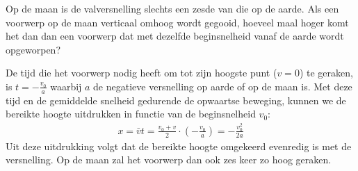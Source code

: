\documentclass{ximera}
\begin{document}
\begin{exercise}
	Op de maan is de valversnelling slechts een zesde van die op de aarde. Als een voorwerp op de maan verticaal omhoog wordt gegooid, hoeveel maal hoger komt het dan dan een voorwerp dat met dezelfde beginsnelheid vanaf de aarde wordt opgeworpen?

	\begin{oplossing}
		De tijd die het voorwerp nodig heeft om tot zijn hoogste punt ($v=0$) te geraken, is $t=-\frac{v_0}{a}$ waarbij $a$ de negatieve versnelling op aarde of op de maan is. Met deze tijd en de gemiddelde snelheid gedurende de opwaartse beweging, kunnen we de bereikte hoogte uitdrukken in functie van de beginsnelheid $v_0$:
		\begin{eqnarray*}
			x=\bar{v}t=\frac{v_0+v}{2}\cdot\left(-\frac{v_0}{a}\right)=-\frac{v_0^2}{2a}
		\end{eqnarray*}
		Uit deze uitdrukking volgt dat de bereikte hoogte omgekeerd evenredig is met de versnelling. Op de maan zal het voorwerp dan ook zes keer zo hoog geraken.
	\end{oplossing}
\end{exercise}
\end{document}

